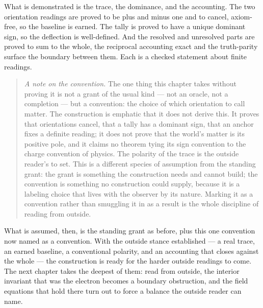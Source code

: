 What is demonstrated is the trace, the dominance, and the accounting. The two orientation readings are
proved to be plus and minus one and to cancel, axiom-free, so the baseline is earned. The tally is proved
to have a unique dominant sign, so the deflection is well-defined. And the resolved and unresolved parts
are proved to sum to the whole, the reciprocal accounting exact and the truth-parity surface the boundary
between them. Each is a checked statement about finite readings.

\begin{quote}
\emph{A note on the convention.} The one thing this chapter takes without proving it is not a grant of
the usual kind --- not an oracle, not a completion --- but a convention: the choice of which orientation
to call matter. The construction is emphatic that it does not derive this. It proves that orientations
cancel, that a tally has a dominant sign, that an anchor fixes a definite reading; it does not prove that
the world's matter is its positive pole, and it claims no theorem tying its sign convention to the charge
convention of physics. The polarity of the trace is the outside reader's to set. This is a different
species of assumption from the standing grant: the grant is something the construction needs and cannot
build; the convention is something no construction could supply, because it is a labeling choice that
lives with the observer by its nature. Marking it as a convention rather than smuggling it in as a result
is the whole discipline of reading from outside.
\end{quote}

What is assumed, then, is the standing grant as before, plus this one convention now named as a
convention. With the outside stance established --- a real trace, an earned baseline, a conventional
polarity, and an accounting that closes against the whole --- the construction is ready for the harder
outside readings to come. The next chapter takes the deepest of them: read from outside, the interior
invariant that was the electron becomes a boundary obstruction, and the field equations that hold there
turn out to force a balance the outside reader can name.
